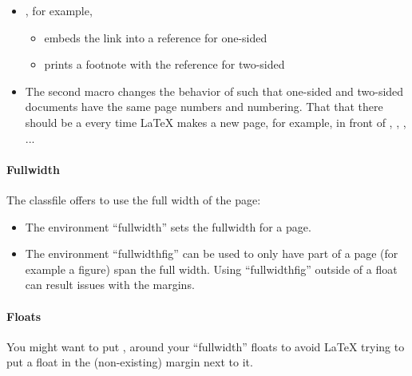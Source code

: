 \begin{itemize}
 	\item {}, for example, 
 	\begin{itemize}
 		\item embeds the link into a reference for one-sided
 		\item prints a footnote with the reference for two-sided
 	\end{itemize}
 	\item The second macro changes the behavior of \detokenize{\cleardoublepage} such that one-sided and two-sided documents have the same page numbers and numbering. That that there should be a \detokenize{\cleardoublepage} every time LaTeX makes a new page, for example, in front of \detokenize{\part}, \detokenize{}, \detokenize{\chapter}, ... 
 \end{itemize} 



\paragraph{Fullwidth}

The classfile offers to use the full width of the page:

\begin{itemize}
	\item The environment ``fullwidth'' sets the fullwidth for a page. 
	\item The environment ``fullwidthfig'' can be used to only have part of a page (for example a figure) span the full width. Using ``fullwidthfig'' outside of a float can result issues with the margins. 
\end{itemize}


\paragraph{Floats}

You might want to put \detokenize{\blockmargin}, \detokenize{\unblockmargin} around your ``fullwidth'' floats to avoid LaTeX trying to put a float in the (non-existing) margin next to it. 

